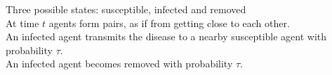\documentclass[preview, border={0pt 1pt 0pt 1pt}, varwidth=10cm]{standalone} %
\begin{document}




    Three possible states: susceptible, infected and removed\\  

    At time \(t\) agents form pairs, as if from getting close to each other.\\

    An infected agent transmits the disease to a nearby susceptible agent with probability \(\tau\).\\

    An infected agent becomes removed with probability \(\tau\).
\end{document}

